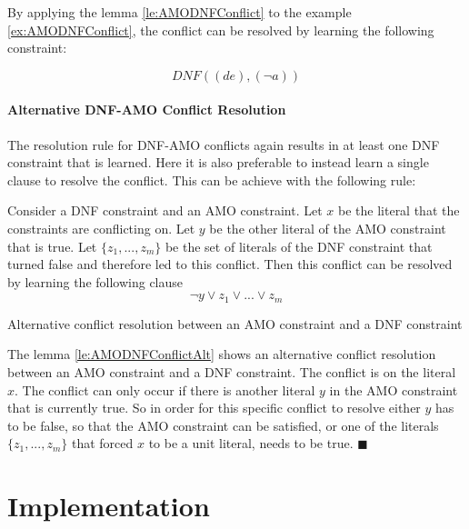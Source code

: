 By applying the lemma \ref{le:AMODNFConflict} to the example \ref{ex:AMODNFConflict}, the conflict can be resolved by learning the following constraint:
\begin{leftbar}
\begin{displaymath}
DNF((de),(\neg a))
\end{displaymath}
\end{leftbar}

\subsubsection{Alternative DNF-AMO Conflict Resolution}

The resolution rule for DNF-AMO conflicts again results in at least one DNF constraint that is learned. Here it is also preferable to instead learn a single clause to resolve the conflict. This can be achieve with the following rule:


\begin{lemma}
\begin{leftbar}
Consider a DNF constraint and an AMO constraint. Let $x$ be the literal that the constraints are conflicting on. Let $y$ be the other literal of the AMO constraint that is true. Let $\{z_1,...,z_m\}$ be the set of literals of the DNF constraint that turned false and therefore led to this conflict. Then this conflict can be resolved by learning the following clause
\begin{displaymath}
\neg y \vee z_1 \vee ... \vee z_m
\end{displaymath}
\end{leftbar}
\caption{Alternative conflict resolution between an AMO constraint and a DNF constraint}
\label{le:AMODNFConflictAlt}
\end{lemma}

The lemma \ref{le:AMODNFConflictAlt} shows an alternative conflict resolution between an AMO constraint and a DNF constraint.
The conflict is on the literal $x$. The conflict can only occur if there is another literal $y$ in the AMO constraint that is currently true. So in order for this specific conflict to resolve either $y$ has to be false, so that the AMO constraint can be satisfied, or one of the literals $\{z_1,...,z_m\}$ that forced $x$ to be a unit literal, needs to be true. $\blacksquare$

\chapter{Implementation}
\label{ch:Implementation}

